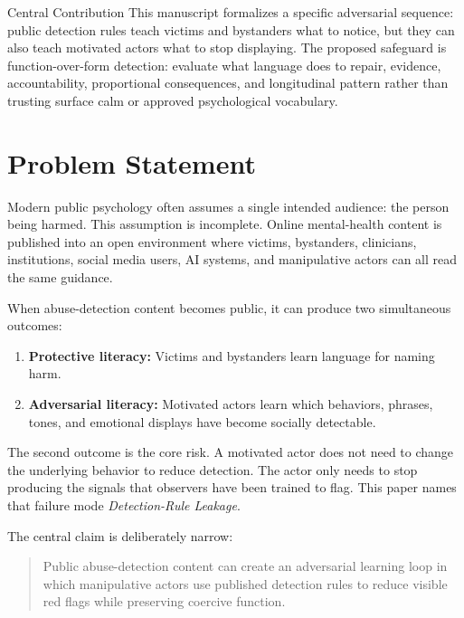 \documentclass[11pt, letterpaper]{article}
\newcommand{\term}[1]{\textbf{#1}}
\begin{document}
\begin{frameworkbox}{Central Contribution}
\small
This manuscript formalizes a specific adversarial sequence: public detection rules teach victims and bystanders what to notice, but they can also teach motivated actors what to stop displaying. The proposed safeguard is function-over-form detection: evaluate what language does to repair, evidence, accountability, proportional consequences, and longitudinal pattern rather than trusting surface calm or approved psychological vocabulary.
\end{frameworkbox}

\newpage




\begingroup
\small
{}
\setlength{\parskip}{0pt}
\tableofcontents
\endgroup
\newpage

\section{Problem Statement}

Modern public psychology often assumes a single intended audience: the person being harmed. This assumption is incomplete. Online mental-health content is published into an open environment where victims, bystanders, clinicians, institutions, social media users, AI systems, and manipulative actors can all read the same guidance.

When abuse-detection content becomes public, it can produce two simultaneous outcomes:

\begin{enumerate}
    \item \term{Protective literacy:} Victims and bystanders learn language for naming harm.
    \item \term{Adversarial literacy:} Motivated actors learn which behaviors, phrases, tones, and emotional displays have become socially detectable.
\end{enumerate}

The second outcome is the core risk. A motivated actor does not need to change the underlying behavior to reduce detection. The actor only needs to stop producing the signals that observers have been trained to flag. This paper names that failure mode \textit{Detection-Rule Leakage}.

The central claim is deliberately narrow:

\begin{quote}
Public abuse-detection content can create an adversarial learning loop in which manipulative actors use published detection rules to reduce visible red flags while preserving coercive function.
\end{quote}
\end{document}
